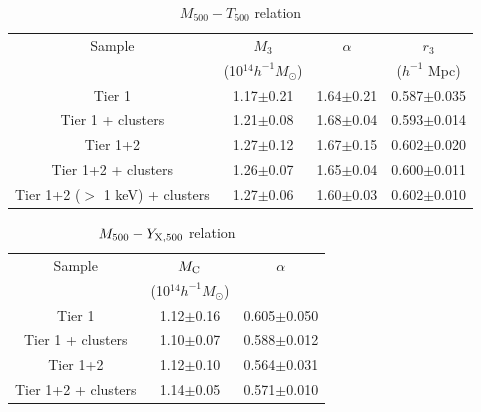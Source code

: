 \documentclass{aastex}
\begin{document}
\begin{table}
\begin{center}
\caption{$M_{500} - T_{500}$ relation}
\begin{tabular}{cccc} \hline \hline
Sample & $M_{3}$ & $\alpha$ & $r_{3}$ \\
       & (10$^{14} h^{-1} M_{\odot}$) &  & ($h^{-1}$ Mpc) \\ \hline

Tier 1 & 1.17$\pm$0.21 & 1.64$\pm$0.21 & 0.587$\pm$0.035 \\
Tier 1 + clusters & 1.21$\pm$0.08 & 1.68$\pm$0.04 & 0.593$\pm$0.014 \\
Tier 1+2 & 1.27$\pm$0.12 & 1.67$\pm$0.15 & 0.602$\pm$0.020 \\
Tier 1+2 + clusters & 1.26$\pm$0.07 & 1.65$\pm$0.04 & 0.600$\pm$0.011 \\
Tier 1+2 ($>$ 1 keV) + clusters & 1.27$\pm$0.06 & 1.60$\pm$0.03 & 0.602$\pm$0.010 \\

\hline \hline
\end{tabular}
\vspace{-1cm}
\end{center}
\end{table}

\begin{table}
\begin{center}
\caption{$M_{500} - Y_{\rm X, 500}$ relation}
\begin{tabular}{ccc} \hline \hline
Sample & $M_{\rm C}$ & $\alpha$ \\
       & (10$^{14} h^{-1} M_{\odot}$) &  \\ \hline

Tier 1 & 1.12$\pm$0.16 & 0.605$\pm$0.050  \\
Tier 1 + clusters & 1.10$\pm$0.07 & 0.588$\pm$0.012  \\
Tier 1+2 & 1.12$\pm$0.10 & 0.564$\pm$0.031 \\
Tier 1+2 + clusters & 1.14$\pm$0.05 & 0.571$\pm$0.010  \\

\hline \hline
\end{tabular}
\vspace{-1cm}
\end{center}
\end{table}
\end{document}
